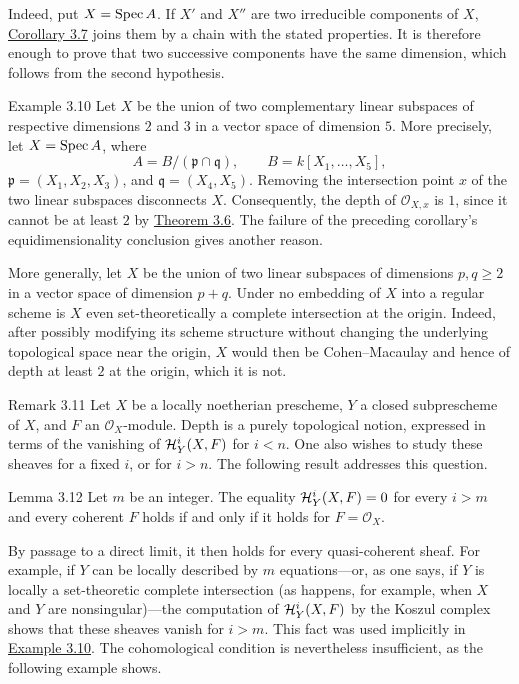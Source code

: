 Indeed, put $X=\operatorname{Spec} A$. If $X'$ and $X''$ are two irreducible components of
$X$, \hyperref[III.3.7]{Corollary 3.7} joins them by a chain with the stated properties. It is
therefore enough to prove that two successive components have the same
dimension, which follows from the second hypothesis.


\begin{sgastatement}{Example 3.10}
Let $X$ be the union of two complementary linear subspaces of respective
dimensions $2$ and $3$ in a vector space of dimension $5$. More precisely,
let $X=\operatorname{Spec} A$, where
\[
  A=B/(\mathfrak p\cap\mathfrak q),\qquad
  B=k[X_1,\ldots,X_5],
\]
$\mathfrak p=(X_1,X_2,X_3)$, and $\mathfrak q=(X_4,X_5)$. Removing the
intersection point $x$ of the two linear subspaces disconnects $X$.
Consequently, the depth of $\mathcal O_{X,x}$ is $1$, since it cannot be at
least $2$ by \hyperref[III.3.6]{Theorem 3.6}. The failure of the preceding corollary's
equidimensionality conclusion gives another reason.

More generally, let $X$ be the union of two linear subspaces of dimensions
$p,q\ge2$ in a vector space of dimension $p+q$. Under no embedding of $X$
into a regular scheme is $X$ even set-theoretically a complete intersection
at the origin. Indeed, after possibly modifying its scheme structure without
changing the underlying topological space near the origin, $X$ would then be
Cohen--Macaulay and hence of depth at least $2$ at the origin, which it is not.
\end{sgastatement}

\begin{sgastatement}{Remark 3.11}
Let $X$ be a locally noetherian prescheme, $Y$ a closed subprescheme of $X$,
and $F$ an $\mathcal O_X$-module. Depth is a purely topological notion,
expressed in terms of the vanishing of $\mathcal H_Y^i(X,F)$ for $i<n$. One also
wishes to study these sheaves for a fixed $i$, or for $i>n$. The following
result addresses this question.
\end{sgastatement}


\begin{sgastatement}{Lemma 3.12}
Let $m$ be an integer. The equality $\mathcal H_Y^i(X,F)=0$ for every $i>m$ and
every coherent $F$ holds if and only if it holds for $F=\mathcal O_X$.
\end{sgastatement}

By passage to a direct limit, it then holds for every quasi-coherent sheaf.
For example, if $Y$ can be locally described by $m$ equations---or, as one
says, if $Y$ is locally a set-theoretic complete intersection (as happens,
for example, when $X$ and $Y$ are nonsingular)---the computation of
$\mathcal H_Y^i(X,F)$ by the Koszul complex shows that these sheaves vanish for
$i>m$. This fact was used implicitly in \hyperref[III.3.10]{Example 3.10}. The cohomological
condition is nevertheless insufficient, as the following example shows.

